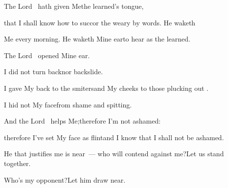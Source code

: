 
\begin{inparaenum}
  \pa{} The Lord \lord\ hath given Me\pa{}the learned's tongue,%

  \pa{}that I shall know how to succor the weary by words. He waketh%

  \pa{}Me every morning. He waketh Mine ear\pa{}to hear as the learned.%

  \pa{} The Lord \lord\ opened Mine ear.%

  \pa{}I did not turn back\pa{}nor backslide.%

  \pa{} I gave My back to the smiters\pa{}and My cheeks to those plucking out .%

  \pa{}I hid not My face\pa{}from shame and spitting.%

  \pa{} And the Lord \lord\ helps Me;\pa{}therefore I'm not ashamed:%

  \pa{}therefore I've set My face as flint\pa{}and I know that I shall not be ashamed.%

  \pa{} He that justifies me is near~--- who will contend against me?\pa{}Let us stand together.%

  \pb{}Who's my opponent?\pa{}Let him draw near.%

\end{inparaenum}
